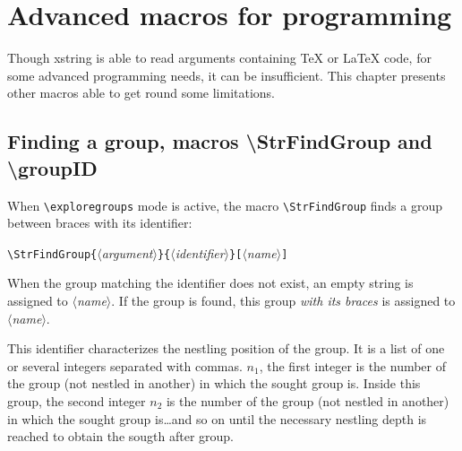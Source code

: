 \documentclass[english,a4paper,10pt]{article}
\newcommand\argu[1]{$\langle$\textit{#1}$\rangle$}
\newcommand\ARGU[1]{\texttt{\{}\argu{#1}\texttt{\}}}
\newcommand\arguC[1]{\texttt{[}\argu{#1}\texttt{]}}
\newcommand\Xstring{\textsf{xstring}\xspace}
\newcommand\verbinline{\lstinline[basicstyle=\normalsize\ttfamily]}
\begin{document}
\section{Advanced macros for programming}
Though \Xstring is able to read arguments containing \TeX{} or \LaTeX{} code, for some advanced programming needs, it can be insufficient. This chapter presents other macros able to get round some limitations.

\subsection{Finding a group, macros {\ttfamily\textbackslash StrFindGroup} and {\ttfamily\textbackslash groupID}}
When \verbinline=\exploregroups= mode is active, the macro \verbinline=\StrFindGroup= finds a group between braces with its identifier:\smallskip

\verbinline|\StrFindGroup|\ARGU{argument}\ARGU{identifier}\arguC{name}\medskip

When the group matching the identifier does not exist, an empty string is assigned to \argu{name}. If the group is found, this group \emph{with its braces} is assigned to \argu{name}.\smallskip

This identifier characterizes the nestling position of the group. It is a list of one or several integers separated with commas. $n_1$, the first integer is the number of the group (not nestled in another) in which the sought group is. Inside this group, the second integer $n_2$ is the number of the group (not nestled in another) in which the sought group is\ldots and so on until the necessary nestling depth is reached to obtain the sougth after group.\bigskip
\end{document}
